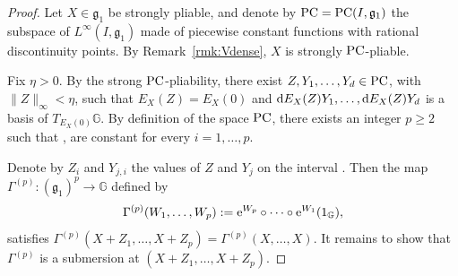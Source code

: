 \documentclass[10pt,a4paper]{amsart}
\numberwithin{equation}{section}
\theoremstyle{definition}
\begin{document}
\begin{proof}
Let $X\in{\mathfrak g}_1$ be strongly pliable, and denote by ${\rm PC}={\rm PC}(I,{\mathfrak g}_1)$ the subspace of $L^\infty(I,{\mathfrak g}_1)$ made of piecewise constant functions with rational discontinuity points. By Remark~\ref{rmk:Vdense}, $X$ is strongly ${\rm PC}$-pliable.


 Fix $\eta>0$. By the strong ${\rm PC}$-pliability, there exist $Z,Y_1,\dots,Y_d\in {\rm PC}$, with $\|Z\|_\infty<\eta$, such that $E_X(Z) = E_X(0)$ and ${\rm d}E_X(Z)Y_1,\dots,{\rm d}E_X(Z)Y_d$ is a basis of $T_{E_X(0)}\mathbb{G}$. By definition of the space ${\rm PC}$, there exists an integer $p\ge 2$ such that ,  are constant for every $i=1,\dots,p$.

 Denote by $Z_i$ and $Y_{j,i}$ the values of $Z$ and $Y_j$ on the interval . Then the map $\Gamma^{(p)}\colon ({\mathfrak g}_1)^p\to\mathbb{G}$ defined by
 \[
 \Gamma^{(p)}(W_1,\dots,W_p):= {\rm e}^{{W_{p}}}\circ \dots \circ {\rm e}^{{W_{1}}}(1_\mathbb{G}),
 \]
satisfies $\Gamma^{(p)} (X+Z_1,\dots,X+Z_p) = \Gamma^{(p)} (X, \dots, X)$.
 It remains to show
that $\Gamma^{(p)}$ is a submersion at $(X+Z_1,\dots,X+Z_p)$.


\end{proof}
\end{document}
